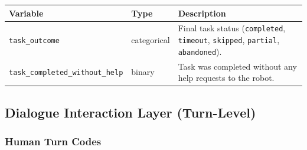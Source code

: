 \documentclass[
]{article}
\newcounter{none} %
\begin{document}
{\def\LTcaptype{none} %
\begin{longtable}[]{@{}
  >{\raggedright\arraybackslash}p{}
  >{\raggedright\arraybackslash}p{}
  >{\raggedright\arraybackslash}p{}@{}}
\toprule\noalign{}
\begin{minipage}[b]{\linewidth}\raggedright
Variable
\end{minipage} & \begin{minipage}[b]{\linewidth}\raggedright
Type
\end{minipage} & \begin{minipage}[b]{\linewidth}\raggedright
Description
\end{minipage} \\
\midrule\noalign{}
\endhead
\bottomrule\noalign{}
\endlastfoot
\texttt{task\_outcome} & categorical & Final task status
(\texttt{completed}, \texttt{timeout}, \texttt{skipped},
\texttt{partial}, \texttt{abandoned}). \\
\texttt{task\_completed\_without\_help} & binary & Task was completed
without any help requests to the robot. \\
\end{longtable}
}

\subsection{Dialogue Interaction Layer
(Turn-Level)}\label{dialogue-interaction-layer-turn-level}

\subsubsection*{Human Turn Codes}\label{human-turn-codes}
\end{document}
